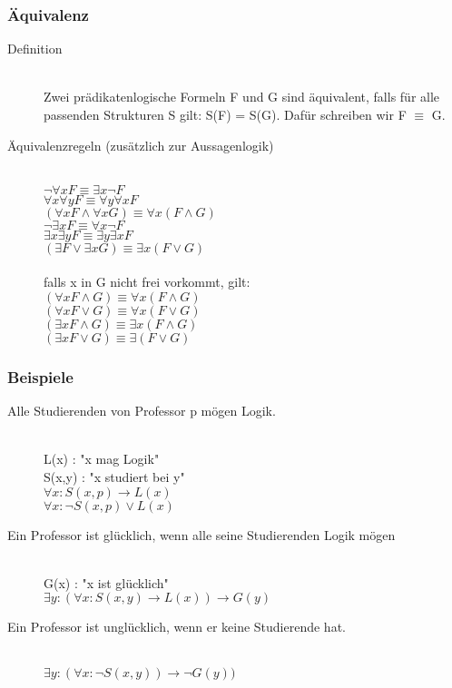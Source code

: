 \documentclass[a4paper,10pt]{article}
\newcommand{\ra}{\rightarrow}
\begin{document}
\subsubsection{\"Aquivalenz}
\begin{description}
	\item[Definition] \hfill \\
		Zwei pr\"adikatenlogische Formeln F und G sind \"aquivalent, falls f\"ur alle passenden Strukturen S gilt: S(F) = S(G). Daf\"ur schreiben wir F $\equiv$ G.
	\item[\"Aquivalenzregeln (zus\"atzlich zur Aussagenlogik)] \hfill \\
		$\neg \forall x F \equiv \exists x \neg F$ \\
		$\forall x \forall y F \equiv \forall y \forall x F$ \\
		$(\forall x F \wedge \forall x G) \equiv \forall x (F \wedge G)$ \\
		$\neg \exists x F \equiv \forall x \neg F$ \\		
		$\exists x \exists y F \equiv \exists y \exists x F$ \\
		$(\exists F \vee \exists x G) \equiv \exists x (F \vee G)$ \\ \\
		falls x in G nicht frei vorkommt, gilt: \\
		$(\forall x F \wedge G) \equiv \forall x (F \wedge G)$ \\
		$(\forall x F \vee G) \equiv \forall x (F \vee G)$ \\
		$(\exists x F \wedge G) \equiv \exists x (F \wedge G)$ \\
		$(\exists x F \vee G) \equiv \exists (F \vee G)$ \\
\end{description}

\subsubsection{Beispiele}
\begin{description}
	\item[Alle Studierenden von Professor p m\"ogen Logik.] \hfill \\
		L(x) : "x mag Logik" \\
		S(x,y) : "x studiert bei y" \\
		$\forall x: S(x,p) \ra L(x)$ \\
		$\forall x: \neg S(x,p) \vee L(x)$
	\item[Ein Professor ist gl\"ucklich, wenn alle seine Studierenden Logik m\"ogen] \hfill \\
		G(x) : "x ist gl\"ucklich" \\
		$\exists y: (\forall x : S(x,y) \ra L(x)) \ra G(y)$
	\item[Ein Professor ist ungl\"ucklich, wenn er keine Studierende hat.] \hfill \\
		$\exists y: (\forall x : \neg S(x,y)) \ra \neg G(y))$
\end{description}
\end{document}
